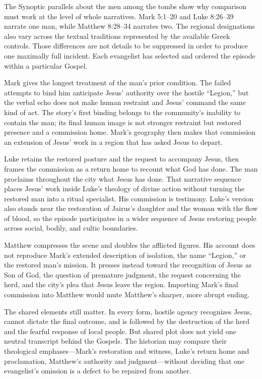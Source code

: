The Synoptic parallels about the men among the tombs show why comparison must
work at the level of whole narratives. Mark 5:1--20 and Luke 8:26--39 narrate
one man, while Matthew 8:28--34 narrates two. The regional designations also
vary across the textual traditions represented by the available Greek
controls. Those differences are not details to be suppressed in order to
produce one maximally full incident. Each evangelist has selected and ordered
the episode within a particular Gospel.

Mark gives the longest treatment of the man's prior condition. The failed
attempts to bind him anticipate Jesus' authority over the hostile ``Legion,''
but the verbal echo does not make human restraint and Jesus' command the same
kind of act. The story's first binding belongs to the community's inability
to contain the man; its final human image is not stronger restraint but
restored presence and a commission home. Mark's geography then makes that
commission an extension of Jesus' work in a region that has asked Jesus to
depart.

Luke retains the restored posture and the request to accompany Jesus, then
frames the commission as a return home to recount what God has done. The man
proclaims throughout the city what Jesus has done. That narrative sequence
places Jesus' work inside Luke's theology of divine action without turning
the restored man into a ritual specialist. His commission is testimony.
Luke's version also stands near the restoration of Jairus's daughter and the
woman with the flow of blood, so the episode participates in a wider sequence
of Jesus restoring people across social, bodily, and cultic boundaries.

Matthew compresses the scene and doubles the afflicted figures. His account
does not reproduce Mark's extended description of isolation, the name
``Legion,'' or the restored man's mission. It presses instead toward the
recognition of Jesus as Son of God, the question of premature judgment, the
request concerning the herd, and the city's plea that Jesus leave the region.
Importing Mark's final commission into Matthew would mute Matthew's sharper,
more abrupt ending.

The shared elements still matter. In every form, hostile agency recognizes
Jesus, cannot dictate the final outcome, and is followed by the destruction
of the herd and the fearful response of local people. But shared plot does not
yield one neutral transcript behind the Gospels. The historian may compare
their theological emphases---Mark's restoration and witness, Luke's return
home and proclamation, Matthew's authority and judgment---without deciding
that one evangelist's omission is a defect to be repaired from another.

